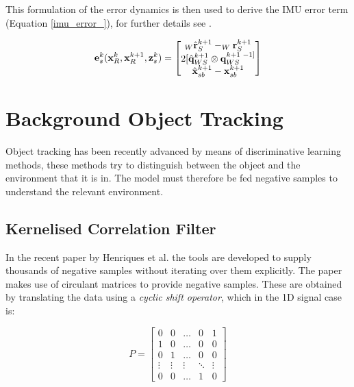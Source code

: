 \documentclass[11pt,twoside]{report}
\begin{document}
This formulation of the error dynamics is then used to derive the IMU error term (Equation \ref{imu_error_}), for further details see \cite{Okvis_1}.


\begin{equation}
\mathbf{e}^{k}_{s}(\mathbf{x}^{k}_{R},\mathbf{x}^{k+1}_{R},\mathbf{z}_{s}^{k}) = 
\begin{bmatrix}
_{W} \hat{\mathbf{r}}_{S}^{k+1} - _{W}\mathbf{r}_{S}^{k+1} \\

2[\hat{\mathbf{q}}_{WS}^{k+1} \otimes \mathbf{q}_{WS}^{k+1 \textnormal{ } -1]} \\

\hat{\mathbf{x}}^{k+1}_{sb} - \mathbf{x}_{sb}^{k+1}
\end{bmatrix}
\label{imu_error_}
\end{equation}

\section{Background Object Tracking}

Object tracking has been recently advanced by means of discriminative learning methods, these methods try to distinguish between the object and the environment that it is in. The model must therefore be fed negative samples to understand the relevant environment. 

\subsection{Kernelised Correlation Filter} \label{kcf_background}

In the recent paper by Henriques et al. \cite{kcf} the tools are developed to supply thousands of negative samples without iterating over them explicitly. The paper makes use of circulant matrices to provide negative samples. These are obtained by translating the data using a \textit{cyclic shift operator}, which in the 1D signal case is:

\begin{equation}
P = 
\begin{bmatrix}
0 & 0 & \dots & 0 & 1 \\
1 & 0 & \dots & 0 & 0 \\
0 & 1 & \dots & 0 & 0 \\
\vdots & \vdots & \vdots & \ddots & \vdots \\
0 & 0 & \dots & 1 & 0
\end{bmatrix}
\end{equation} 
\end{document}

